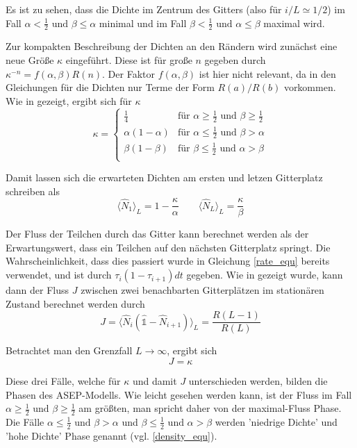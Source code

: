 \documentclass[10pt,a4paper]{report}
\begin{document}
Es ist zu sehen, dass die Dichte im Zentrum des Gitters (also für $i/L\simeq 1/2$) im Fall $\alpha<\frac{1}{2}\text{ und }\beta\leq\alpha$ minimal und im Fall $\beta<\frac{1}{2}\text{ und }\alpha\leq\beta$ maximal wird. 

Zur kompakten Beschreibung der Dichten an den Rändern wird zunächst eine neue Größe $\kappa$ eingeführt. Diese ist für große $n$ gegeben durch $\kappa^{-n}=f(\alpha,\beta)R(n)$. Der Faktor $f(\alpha,\beta)$ ist hier nicht relevant, da in den Gleichungen für die Dichten nur Terme der Form $R(a)/R(b)$ vorkommen. Wie in \cite{ASEP} gezeigt, ergibt sich für $\kappa$
\begin{equation}
\kappa=
\begin{cases}
\frac{1}{4}&\text{für }\alpha\geq\frac{1}{2}\text{ und }\beta\geq\frac{1}{2}\\
\alpha(1-\alpha)&\text{für }\alpha\leq\frac{1}{2}\text{ und }\beta>\alpha\\
\beta(1-\beta)&\text{für }\beta\leq\frac{1}{2}\text{ und }\alpha>\beta\\
\end{cases}
\end{equation}

Damit lassen sich die erwarteten Dichten am ersten und letzen Gitterplatz schreiben als
\begin{equation}
\langle\hat{N}_1\rangle_L=1-\frac{\kappa}{\alpha} \qquad \langle\hat{N}_L\rangle_L=\frac{\kappa}{\beta}
\end{equation}

Der Fluss der Teilchen durch das Gitter kann berechnet werden als der Erwartungswert, dass ein Teilchen auf den nächsten Gitterplatz springt. Die Wahrscheinlichkeit, dass dies passiert wurde in Gleichung \ref{rate_equ} bereits verwendet, und ist durch $\tau_i(1-\tau_{i+1})dt$ gegeben. Wie in \cite{ASEP} gezeigt wurde, kann dann der Fluss $J$ zwischen zwei benachbarten Gitterplätzen im stationären Zustand berechnet werden durch
\begin{equation}
J=\langle\hat{N}_i(\hat{\mathbb{1}}-\hat{N}_{i+1})\rangle_L=\frac{R(L-1)}{R(L)}
\end{equation}

Betrachtet man den Grenzfall $L\rightarrow\infty$, ergibt sich
\begin{equation}
J=\kappa
\end{equation}

Diese drei Fälle, welche für $\kappa$ und damit $J$ unterschieden werden, bilden die Phasen des ASEP-Modells. Wie leicht gesehen werden kann, ist der Fluss im Fall $\alpha\geq\frac{1}{2}\text{ und }\beta\geq\frac{1}{2}$ am größten, man spricht daher von der maximal-Fluss Phase. Die Fälle $\alpha\leq\frac{1}{2}\text{ und }\beta>\alpha$ und $\beta\leq\frac{1}{2}\text{ und }\alpha>\beta$ werden 'niedrige Dichte' und 'hohe Dichte' Phase genannt (vgl. \ref{density_equ}). 
\end{document}
